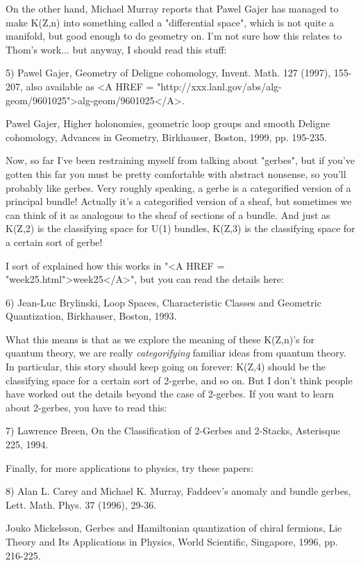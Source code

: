On the other hand, Michael Murray reports that Pawel Gajer has managed
to make K(Z,n) into something called a "differential space",
which is not quite a manifold, but good enough to do geometry on.  I'm
not sure how this relates to Thom's work... but anyway, I should read
this stuff:

5) Pawel Gajer, Geometry of Deligne cohomology, Invent. Math. 127
(1997), 155-207, also available as 
<A HREF = "http://xxx.lanl.gov/abs/alg-geom/9601025">alg-geom/9601025</A>.

Pawel Gajer, Higher holonomies, geometric loop groups and smooth Deligne 
cohomology, Advances in Geometry, Birkhauser, Boston, 1999, pp. 195-235.

Now, so far I've been restraining myself from talking about
"gerbes", but if you've gotten this far you must be pretty
comfortable with abstract nonsense, so you'll probably like gerbes.
Very roughly speaking, a gerbe is a categorified version of a
principal bundle!  Actually it's a categorified version of a sheaf,
but sometimes we can think of it as analogous to the sheaf of sections
of a bundle.  And just as K(Z,2) is the classifying space for U(1)
bundles, K(Z,3) is the classifying space for a certain sort of gerbe!

I sort of explained how this works in "<A HREF =
"week25.html">week25</A>", but you can read the details here:

6) Jean-Luc Brylinski, Loop Spaces, Characteristic Classes and Geometric 
Quantization, Birkhauser, Boston, 1993.

What this means is that as we explore the meaning of these K(Z,n)'s
for quantum theory, we are really \emph{categorifying} familiar
ideas from quantum theory.  In particular, this story should keep
going on forever: K(Z,4) should be the classifying space for a certain
sort of 2-gerbe, and so on.  But I don't think people have worked out
the details beyond the case of 2-gerbes.  If you want to learn about
2-gerbes, you have to read this:

7) Lawrence Breen, On the Classification of 2-Gerbes and 2-Stacks, 
Asterisque 225, 1994. 

Finally, for more applications to physics, try these papers:

8) Alan L. Carey and Michael K. Murray, Faddeev's anomaly and bundle 
gerbes, Lett. Math. Phys. 37 (1996), 29-36.

Jouko Mickelsson, Gerbes and Hamiltonian quantization of chiral fermions,
Lie Theory and Its Applications in Physics, World Scientific, Singapore,
1996, pp. 216-225.

